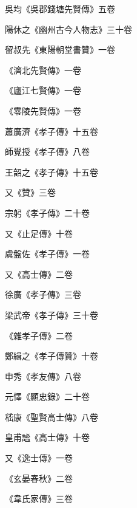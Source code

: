 \begin{pinyinscope}
 吳均《吳郡錢塘先賢傳》五卷



 陽休之《幽州古今人物志》三十卷



 留叔先《東陽朝堂書贊》一卷



 《濟北先賢傳》一卷



 《廬江七賢傳》一卷



 《零陵先賢傳》一卷



 蕭廣濟《孝子傳》十五卷



 師覺授《孝子傳》八卷



 王韶之《孝子傳》十五卷



 又《贊》三卷



 宗躬《孝子傳》二十卷



 又《止足傳》十卷



 虞盤佐《孝子傳》一卷



 又《高士傳》二卷



 徐廣《孝子傳》三卷



 梁武帝《孝子傳》三十卷



 《雜孝子傳》二卷



 鄭緝之《孝子傳贊》十卷



 申秀《孝友傳》八卷



 元懌《顯忠錄》二十卷



 嵇康《聖賢高士傳》八卷



 皇甫謐《高士傳》十卷



 又《逸士傳》一卷



 《玄晏春秋》二卷



 《韋氏家傳》三卷




\end{pinyinscope}
